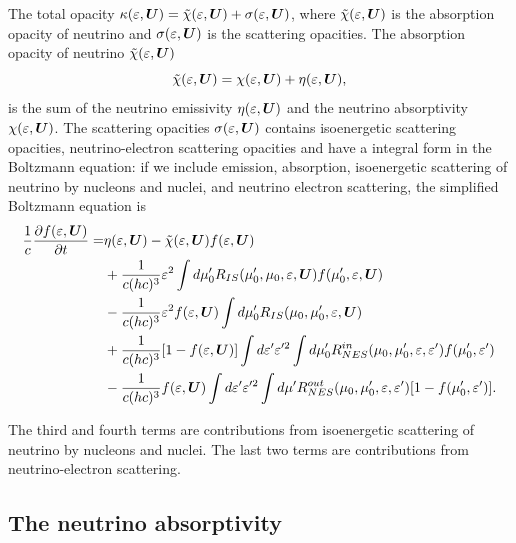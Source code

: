 \documentclass[10pt,preprint]{aastex}
\begin{document}
The total opacity $\kappa(\varepsilon,\boldsymbol{U})=\tilde{\chi}(\varepsilon,\boldsymbol{U})+\sigma(\varepsilon,\boldsymbol{U})$, where $\tilde{\chi}(\varepsilon,\boldsymbol{U})$ is the absorption opacity of neutrino and  $\sigma(\varepsilon,\boldsymbol{U})$ is the scattering opacities. 
The absorption opacity of neutrino $\tilde{\chi}(\varepsilon,\boldsymbol{U})$ 
\begin{equation}
  \tilde{\chi}(\varepsilon,\boldsymbol{U}) = \chi(\varepsilon,\boldsymbol{U}) + \eta(\varepsilon,\boldsymbol{U}), 
\end{equation}
 is the sum of the neutrino emissivity $\eta(\varepsilon,\boldsymbol{U}) $ and the neutrino absorptivity  $ \chi(\varepsilon,\boldsymbol{U})$. The scattering opacities $\sigma(\varepsilon,\boldsymbol{U})$ contains isoenergetic scattering opacities, neutrino-electron scattering opacities and have a integral form in the Boltzmann equation: if we include emission, absorption, isoenergetic scattering of neutrino by nucleons and nuclei, and neutrino electron scattering, the simplified Boltzmann equation is
\begin{align}
\dfrac{1}{c}\dfrac{\partial f(\varepsilon,\boldsymbol{U})}{\partial t} = 
&  \eta(\varepsilon,\boldsymbol{U}) - \tilde{\chi}(\varepsilon,\boldsymbol{U})f(\varepsilon,\boldsymbol{U}) \nonumber \\
& + \dfrac{1}{c(hc)^3} \varepsilon^2 \int d\mu^\prime_0 R_{IS}( \mu^\prime_0, \mu_0,\varepsilon, \boldsymbol{U}) f(\mu^\prime_0, \varepsilon,\boldsymbol{U}) \nonumber \\
& - \dfrac{1}{c(hc)^3} \varepsilon^2 f(\varepsilon,\boldsymbol{U})\int d\mu^\prime_0 R_{IS}(\mu_0, \mu^\prime_0, \varepsilon,\boldsymbol{U}) \nonumber \\
& + \dfrac{1}{c(hc)^3} [1- f(\varepsilon,\boldsymbol{U})] \int d\varepsilon^{\prime} \varepsilon^{\prime 2} \int d\mu^\prime_0 R^{in}_{NES} (\mu_0,\mu^\prime_0,\varepsilon,\varepsilon^{\prime} )f(\mu^\prime_0,\varepsilon^{\prime} ) \nonumber \\
& - \dfrac{1}{c(hc)^3} f(\varepsilon,\boldsymbol{U}) \int d\varepsilon^{\prime} \varepsilon^{\prime 2} \int d\mu^\prime R^{out}_{NES} (\mu_0,\mu^\prime_0,\varepsilon,\varepsilon^{\prime} ) [1-f(\mu^\prime_0,\varepsilon^{\prime} )] .
\end{align}

The third and fourth terms are contributions from isoenergetic scattering of neutrino by nucleons and nuclei. The last two terms are contributions from neutrino-electron scattering. 

\subsection{The neutrino absorptivity}
\end{document}
